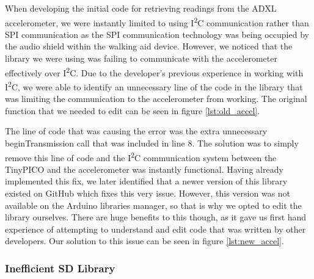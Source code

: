                 When developing the initial code for retrieving readings from the ADXL accelerometer, we were instantly limited to using I\textsuperscript{2}C communication rather than SPI communication as the SPI communication technology was being occupied by the audio shield within the walking aid device. However, we noticed that the library we were using was failing to communicate with the accelerometer effectively over I\textsuperscript{2}C. Due to the developer's previous experience in working with I\textsuperscript{2}C, we were able to identify an unnecessary line of the code in the library that was limiting the communication to the accelerometer from working. The original function that we needed to edit can be seen in figure \ref{lst:old_accel}.

                

                The line of code that was causing the error was the extra unnecessary beginTransmission call that was included in line 8. The solution was to simply remove this line of code and the I\textsuperscript{2}C communication system between the TinyPICO and the accelerometer was instantly functional. Having already implemented this fix, we later identified that a newer version of this library existed on GitHub which fixes this very issue. However, this version was not available on the Arduino libraries manager, so that is why we opted to edit the library ourselves. There are huge benefits to this though, as it gave us first hand experience of attempting to understand and edit code that was written by other developers. Our solution to this issue can be seen in figure \ref{lst:new_accel}.

                

            \subsubsection{Inefficient SD Library}

